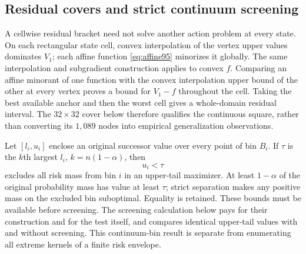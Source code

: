 \subsection{Residual covers and strict continuum screening}
A cellwise residual bracket need not solve another action problem at every state. On each rectangular state cell, convex interpolation of the vertex upper values dominates $V_1$; each affine function \eqref{eq:affine95} minorizes it globally. The same interpolation and subgradient construction applies to convex $f$. Comparing an affine minorant of one function with the convex interpolation upper bound of the other at every vertex proves a bound for $V_1-f$ throughout the cell. Taking the best available anchor and then the worst cell gives a whole-domain residual interval. The $32\times32$ cover below therefore qualifies the continuous square, rather than converting its $1,089$ nodes into empirical generalization observations.

Let $[l_i,u_i]$ enclose an original successor value over every point of bin $B_i$. If $\tau$ is the $k$th largest $l_i$, $k=n(1-\alpha)$, then
\begin{equation}\label{eq:strict95}
 u_i<\tau
\end{equation}
excludes all risk mass from bin $i$ in an upper-tail maximizer. At least $1-\alpha$ of the original probability mass has value at least $\tau$; strict separation makes any positive mass on the excluded bin suboptimal. Equality is retained. These bounds must be available before screening. The screening calculation below pays for their construction and for the test itself, and compares identical upper-tail values with and without screening. This continuum-bin result is separate from enumerating all extreme kernels of a finite risk envelope.

